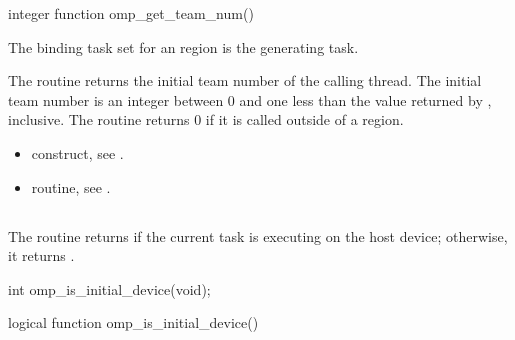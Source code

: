 \begin{fortranspecific}
\begin{ompfFunction}
integer function omp_get_team_num()
\end{ompfFunction}
\end{fortranspecific}

\binding
The binding task set for an  region is the generating task.

\effect
The  routine returns the initial team number of the calling thread. The
initial team number is an integer between 0 and one less than the value returned by
, inclusive. The routine returns 0 if it is called outside of a
 region.

\crossreferences
\begin{itemize}
\item {} construct, see
.

\item {} routine, see
.
\end{itemize}









\subsection{}
\label{subsec:omp_is_initial_device}
\summary
The  routine returns  if the current task is executing
on the host device; otherwise, it returns .

\begin{samepage}
\format
\begin{ccppspecific}
\begin{ompcFunction}
int omp_is_initial_device(void);
\end{ompcFunction}
\end{ccppspecific}
\end{samepage}

\begin{fortranspecific}
\begin{ompfFunction}
logical function omp_is_initial_device()
\end{ompfFunction}
\end{fortranspecific}

